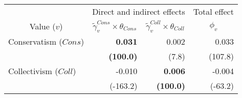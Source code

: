 
\begin{tabular}{lrrr}
\toprule
\multicolumn{1}{c}{ } & \multicolumn{2}{c}{Direct and indirect effects} & \multicolumn{1}{c}{Total effect} \\
\cmidrule(l{3pt}r{3pt}){2-3} \cmidrule(l{3pt}r{3pt}){4-4}
\multicolumn{1}{c}{Value ($v$)} & \multicolumn{1}{c}{$\widetilde{\gamma}^{Cons}_v \times \theta_{Cons}$} & \multicolumn{1}{c}{$\widetilde{\gamma}^{Coll}_v \times \theta_{Coll}$} & \multicolumn{1}{c}{${\phi}_v$}\\
\midrule
Conservatism ($Cons$) & \textbf{0.031} & 0.002 & 0.033\\
 & \textbf{(100.0)} & (7.8) & (107.8)\\
Collectivism ($Coll$) & -0.010 & \textbf{0.006} & -0.004\\
 & (-163.2) & \textbf{(100.0)} & (-63.2)\\
\bottomrule
\end{tabular}
